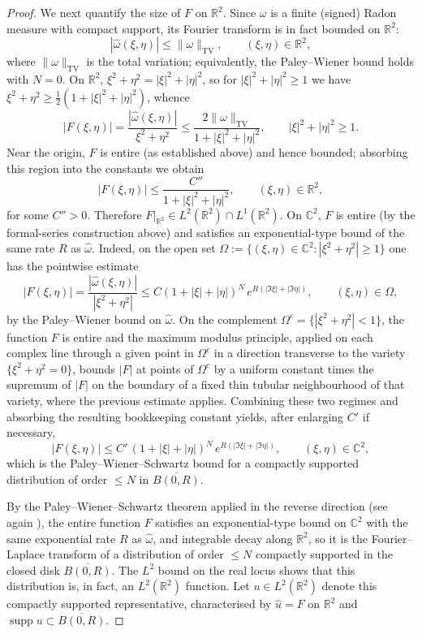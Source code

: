 \documentclass[a4paper,11pt,reqno]{amsart}
\numberwithin{equation}{section}
\theoremstyle{plain} %
\theoremstyle{definition} %
\theoremstyle{remark}
\newcommand{\R}{\mathbb{R}}
\newcommand{\C}{\mathbb{C}}
\begin{document}
\begin{proof}
We next quantify the size of $F$ on $\R^2$. Since $\omega$ is a finite
(signed) Radon measure with compact support, its Fourier transform is in
fact bounded on $\R^2$:
\[
|\widehat{\omega}(\xi,\eta)|\le \|\omega\|_{\mathrm{TV}},
\qquad (\xi,\eta)\in\R^2,
\]
where $\|\omega\|_{\mathrm{TV}}$ is the total variation; equivalently,
the Paley--Wiener bound holds with $N=0$. On $\R^2$, $\xi^2+\eta^2=
|\xi|^2+|\eta|^2$, so for $|\xi|^2+|\eta|^2\ge 1$ we have $\xi^2+\eta^2
\ge \tfrac{1}{2}(1+|\xi|^2+|\eta|^2)$, whence
\[
|F(\xi,\eta)|=\frac{|\widehat\omega(\xi,\eta)|}{\xi^2+\eta^2}
\le \frac{2\|\omega\|_{\mathrm{TV}}}{1+|\xi|^2+|\eta|^2},
\qquad |\xi|^2+|\eta|^2\ge 1.
\]
Near the origin, $F$ is entire (as established above) and hence bounded;
absorbing this region into the constants we obtain
\[
|F(\xi,\eta)|\le \frac{C''}{1+|\xi|^2+|\eta|^2},
\qquad (\xi,\eta)\in\R^2,
\]
for some $C''>0$. Therefore $F|_{\R^2}\in L^2(\R^2)\cap L^1(\R^2)$. On
$\C^2$, $F$ is entire (by the formal-series construction above) and
satisfies an exponential-type bound of the same rate $R$ as
$\widehat\omega$. Indeed, on the open set
$\Omega:=\{(\xi,\eta)\in\C^2:|\xi^2+\eta^2|\ge 1\}$ one has the pointwise
estimate
\[
|F(\xi,\eta)|=\frac{|\widehat\omega(\xi,\eta)|}{|\xi^2+\eta^2|}
\le C(1+|\xi|+|\eta|)^{N}\,e^{R(|\Im\xi|+|\Im\eta|)},
\qquad (\xi,\eta)\in\Omega,
\]
by the Paley--Wiener bound on $\widehat\omega$. On the complement
$\Omega^c=\{|\xi^2+\eta^2|<1\}$, the function $F$ is entire and the
maximum modulus principle, applied on each complex line through a given
point in $\Omega^c$ in a direction transverse to the variety
$\{\xi^2+\eta^2=0\}$, bounds $|F|$ at points of $\Omega^c$ by a uniform
constant times the supremum of $|F|$ on the boundary of a fixed thin
tubular neighbourhood of that variety, where the previous estimate
applies. Combining these two regimes and absorbing the resulting
bookkeeping constant yields, after enlarging $C'$ if necessary,
\[
|F(\xi,\eta)|\le C'\,(1+|\xi|+|\eta|)^{N}\,
e^{R(|\Im \xi|+|\Im \eta|)},
\qquad (\xi,\eta)\in\C^2,
\]
which is the Paley--Wiener--Schwartz bound for a compactly supported
distribution of order $\le N$ in $\overline{B(0,R)}$.

By the Paley--Wiener--Schwartz theorem applied in the reverse direction
(see again \cite{Hormander}), the entire function $F$
satisfies an exponential-type bound on $\C^2$ with the same exponential
rate $R$ as $\widehat\omega$, and integrable decay along $\R^2$, so it is
the Fourier--Laplace transform of a distribution of order $\le N$
compactly supported in the closed disk $\overline{B(0,R)}$. The $L^2$
bound on the real locus shows that this distribution is, in fact, an
$L^2(\R^2)$ function. Let $u\in L^2(\R^2)$ denote this compactly supported
representative, characterised by $\widehat u = F$ on $\R^2$ and
$\operatorname{supp} u\subset \overline{B(0,R)}$.


\end{proof}
\end{document}
